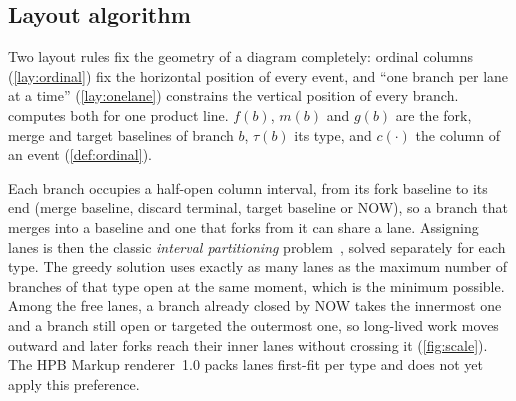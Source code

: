 \subsection{Layout algorithm}
\label{app:layout}
\label{sec:impl-layout}

Two layout rules fix the geometry of a diagram completely: ordinal columns
(\ref{lay:ordinal}) fix the horizontal position of every event, and ``one
branch per lane at a time'' (\ref{lay:onelane}) constrains the vertical
position of every branch.  computes both for one product
line. $f(b)$, $m(b)$ and $g(b)$ are the fork, merge and target baselines
of branch $b$, $\tau(b)$ its type, and $c(\cdot)$ the column of an event
(\cref{def:ordinal}).

Each branch occupies a half-open column interval, from its fork baseline
to its end (merge baseline, discard terminal, target baseline or NOW), so a
branch that merges into a baseline and one that forks from it can share a
lane. Assigning lanes is then the classic \emph{interval partitioning}
problem~\citep{kleinberg2006algo}, solved separately for each type. The
greedy solution uses exactly as many lanes as the maximum number of
branches of that type open at the same moment, which is the minimum
possible. Among the free lanes, a branch already closed by NOW takes the
innermost one and a branch still open or targeted the outermost one, so
long-lived work moves outward and later forks reach their inner lanes
without crossing it (\cref{fig:scale}). The HPB Markup renderer~1.0 packs
lanes first-fit per type and does not yet apply this preference.

